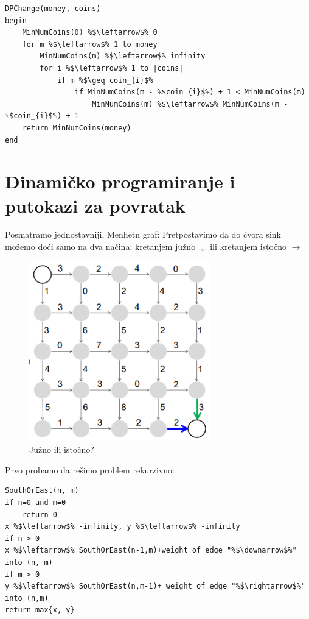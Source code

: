 \begin{lstlisting}
DPChange(money, coins)
begin
    MinNumCoins(0) %$\leftarrow$% 0 
    for m %$\leftarrow$% 1 to money
        MinNumCoins(m) %$\leftarrow$% infinity
        for i %$\leftarrow$% 1 to |coins|
            if m %$\geq coin_{i}$%
                if MinNumCoins(m - %$coin_{i}$%) + 1 < MinNumCoins(m)
                    MinNumCoins(m) %$\leftarrow$% MinNumCoins(m - %$coin_{i}$%) + 1
	return MinNumCoins(money)
end
\end{lstlisting}


\section{Dinamičko programiranje i putokazi za povratak}

Posmatramo jednostavniji, Menhetn graf:
Pretpostavimo da do čvora sink možemo doći samo na dva načina: kretanjem južno $\downarrow$ ili kretanjem istočno $\rightarrow$

\begin{figure}[h!]
\centering
\includegraphics[width=0.7\textwidth]{poglavlja/5/slike/putokazi.png}
\caption{Južno ili istočno?}
\label{slika:putokazi}
\end{figure}

\noindent Prvo probamo da rešimo problem rekurzivno:

\begin{lstlisting}
SouthOrEast(n, m)
if n=0 and m=0
    return 0
x %$\leftarrow$% -infinity, y %$\leftarrow$% -infinity
if n > 0
x %$\leftarrow$% SouthOrEast(n-1,m)+weight of edge "%$\downarrow$%" into (n, m)
if m > 0
y %$\leftarrow$% SouthOrEast(n,m-1)+ weight of edge "%$\rightarrow$%" into (n,m)
return max{x, y}
\end{lstlisting}

